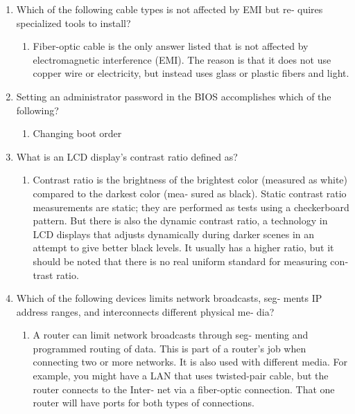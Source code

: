 \documentclass{article}
\begin{document}
\begin{enumerate}
\begin{enumerate}
    \end{enumerate}
    \item Which	of	the	following	cable	types	is	not	affected	by	EMI	but	re‐
quires	specialized	tools	to	install?

    \begin{enumerate}
        \item Fiber-optic	cable	is	the	only	answer	listed	that	is
not	affected	by	electromagnetic	interference	(EMI).	The	reason	is
that	it	does	not	use	copper	wire	or	electricity,	but	instead	uses
glass	or	plastic	fibers	and	light.
    \end{enumerate}
    \item Setting	an	administrator	password	in	the	BIOS	accomplishes
which	of	the	following?

    \begin{enumerate}
        \item Changing boot order
    \end{enumerate}
    \item What	is	an	LCD	display’s	contrast	ratio	defined	as?
    \begin{enumerate}
        \item 	Contrast	ratio	is	the	brightness	of	the	brightest
color	(measured	as	white)	compared	to	the	darkest	color	(mea‐
sured	as	black).	Static	contrast	ratio	measurements	are	static;	they
are	performed	as	tests	using	a	checkerboard	pattern.	But	there	is
also	the	dynamic	contrast	ratio,	a	technology	in	LCD	displays
that	adjusts	dynamically	during	darker	scenes	in	an	attempt	to
give	better	black	levels.	It	usually	has	a	higher	ratio,	but	it	should
be	noted	that	there	is	no	real	uniform	standard	for	measuring	con‐
trast	ratio.

    \end{enumerate}
    \item Which	of	the	following	devices	limits	network	broadcasts,	seg‐
ments	IP	address	ranges,	and	interconnects	different	physical	me‐
dia?

    \begin{enumerate}
        \item A	router	can	limit	network	broadcasts	through	seg‐
menting	and	programmed	routing	of	data.	This	is	part	of	a
router’s	job	when	connecting	two	or	more	networks.	It	is	also
used	with	different	media.	For	example,	you	might	have	a	LAN
that	uses	twisted-pair	cable,	but	the	router	connects	to	the	Inter‐
net	via	a	fiber-optic	connection.	That	one	router	will	have	ports
for	both	types	of	connections.


\end{enumerate}
\end{enumerate}
\end{document}
